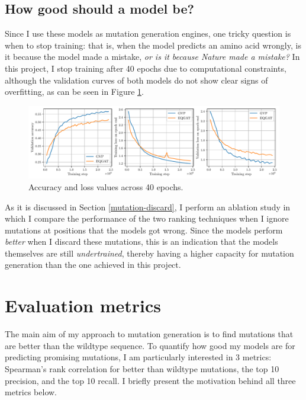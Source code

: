\subsection{How good should a model be?}
\label{training-discussion}
Since I use these models as mutation generation engines, one tricky question is when to stop training: that is, when the model predicts an amino acid wrongly, is it because the model made a mistake, \textit{or is it because Nature made a mistake?} In this project, I stop training after 40 epochs due to computational constraints, although the validation curves of both models do not show clear signs of overfitting, as can be seen in Figure \ref{train-plots}.

\begin{figure}[!htb]
    \centering
    \includegraphics[width=\textwidth]{masters-report/figures/validation_acc.pdf}
    \caption{Accuracy and loss values across 40 epochs.}
    \label{train-plots}
\end{figure}

As it is discussed in Section \ref{mutation-discard}, I perform an ablation study in which I compare the performance of the two ranking techniques when I ignore mutations at positions that the models got wrong. Since the models perform \textit{better} when I discard these mutations, this is an indication that the models themselves are still \textit{undertrained}, thereby having a higher capacity for mutation generation than the one achieved in this project. 

\section{Evaluation metrics}
The main aim of my approach to mutation generation is to find mutations that are better than the wildtype sequence. To quantify how good my models are for predicting promising mutations, I am particularly interested in 3 metrics: Spearman's rank correlation for better than wildtype mutations, the top 10 precision, and the top 10 recall. I briefly present the motivation behind all three metrics below. 

